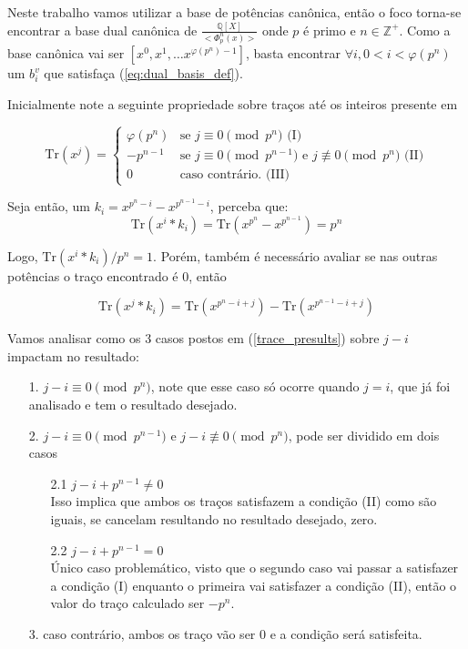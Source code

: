 Neste trabalho vamos utilizar a base de potências canônica, então o foco torna-se encontrar a base dual canônica de $\frac{\mathbb{Q}[X]}{<\Phi_p^n(x)>}$ onde $p$ é primo e $n \in \mathbb{Z}^+$. 
Como a base canônica vai ser $[x^0,x^1, \dots x^{\varphi(p^n)-1}]$, basta encontrar $\forall i, 0 < i < \varphi(p^n)$ um $b_i^v$ que satisfaça (\ref{eq:dual_basis_def}).

Inicialmente note a seguinte propriedade sobre traços até os inteiros presente em \cite{lyubashevsky2013}

\begin{equation}
    \mathrm{Tr}(x^j) =
    \begin{cases}
    \varphi(p^n) & \text{se } j \equiv 0 \pmod{p^n} \text{ (I)} \\
    -p^{n-1} & \text{se } j \equiv 0 \pmod{p^{n-1}} \text{ e } j \not\equiv 0 \pmod{p^n} \text{ (II)}\\
    0 & \text{caso contrário.} \text{ (III)}
    \end{cases}
    \label{trace_presults}
\end{equation}

Seja então, um $k_i = x^{p^n - i} - x^{p^{n-1} - i}$, perceba que:
\begin{equation}
    \mathrm{Tr}(x^i*k_i) = \mathrm{Tr}(x^{p^n} - x^{p^{n-1}}) = p^n   
\end{equation}

Logo, $\mathrm{Tr}(x^i*k_i) / p^n = 1$. Porém, também é necessário avaliar se nas outras potências
o traço encontrado é $0$, então

\begin{equation}
    \mathrm{Tr}(x^j*k_i) = \mathrm{Tr}(x^{p^n- i + j}) - \mathrm{Tr}(x^{p^{n-1} - i + j})
\end{equation}

Vamos analisar como os 3 casos postos em (\ref{trace_presults}) sobre $j-i$ impactam no resultado:
\begin{itemize}
    \item[1.] $j-i \equiv 0 \pmod{p^n}$, note que esse caso só ocorre quando $j = i$, que já foi analisado e tem o resultado desejado. 
    \item[2.] $j-i \equiv 0 \pmod{p^{n-1}} \text{ e } j-i \not\equiv 0 \pmod{p^n}$, pode ser dividido em dois casos
    \begin{itemize}
        \item[2.1] $j-i + p^{n-1} \neq 0$ \\
        Isso implica que ambos os traços satisfazem a condição (II) como são iguais, se cancelam resultando no resultado desejado, zero. 
        \item[2.2] $j-i + p^{n-1} = 0$ \\
        Único caso problemático, visto que o segundo caso vai passar a satisfazer a condição (I) enquanto o primeira vai satisfazer
        a condição (II), então o valor do traço calculado ser $-p^n$.
    \end{itemize} 
    \item[3.] caso contrário, ambos os traço vão ser $0$ e a condição será satisfeita.
\end{itemize}

